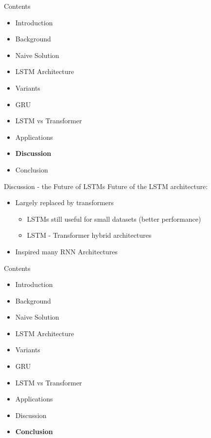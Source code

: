\documentclass[10pt, aspectratio=169]{beamer}
\begin{document}
\begin{frame}[t]{Contents}
\begin{itemize}
    \item Introduction
    \item Background
    \item Naive Solution
    \item LSTM Architecture
    \item Variants
    \item GRU
    \item LSTM vs Transformer
    \item Applications
    \item \textbf{Discussion}
    \item Conclusion
\end{itemize}
\end{frame}

\begin{frame}[t]{Discussion - the Future of LSTMs}
Future of the LSTM architecture: \pause
\begin{itemize}
    \item Largely replaced by transformers \pause
    \begin{itemize}
        \item LSTMs still useful for small datasets (better performance) \pause
        \item LSTM - Transformer hybrid architectures \pause
    \end{itemize} 
    \item Inspired many RNN Architectures \pause
\end{itemize}
\end{frame}

\begin{frame}[t]{Contents}
\begin{itemize}
    \item Introduction
    \item Background
    \item Naive Solution
    \item LSTM Architecture
    \item Variants
    \item GRU
    \item LSTM vs Transformer
    \item Applications
    \item Discussion
    \item \textbf{Conclusion}
\end{itemize}
\end{frame}
\end{document}
